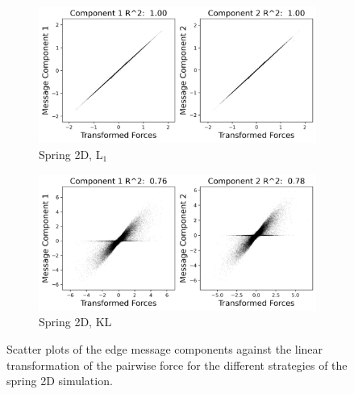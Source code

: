 \documentclass[11pt]{article}
\begin{document}
\begin{figure}[H]
        \begin{subfigure}{0.45\textwidth}
            \includegraphics[width=\textwidth]{figs/spring_2d_l1_r2.png}
            \caption{Spring 2D, L$_1$}
        \end{subfigure}
        \begin{subfigure}{0.45\textwidth}
            \includegraphics[width=\textwidth]{figs/spring_2d_kl_r2.png}
            \caption{Spring 2D, KL}
        \end{subfigure}
        \caption{Scatter plots of the edge message components against the linear transformation of the pairwise force for the different strategies of the spring 2D simulation.}
        \label{fig:scatter_plots}
    \end{figure}
\end{document}
